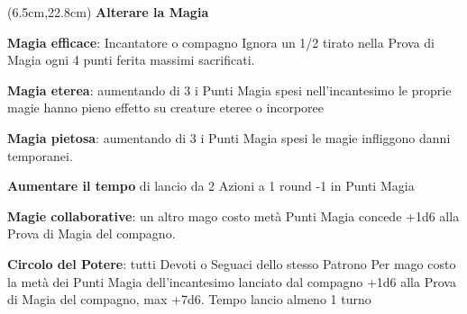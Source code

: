 \documentclass[a4paper,12 pt,openany]{book}
\begin{document}
{\small
\begin{textblock*}{13.5cm}(6.5cm,22.8cm) %
\textbf{Alterare la Magia}

	\textbf{Magia efficace}: Incantatore o compagno Ignora un 1/2 tirato nella Prova di Magia ogni 4 punti ferita massimi sacrificati.

	\textbf{Magia eterea}: aumentando di 3 i Punti Magia spesi nell'incantesimo le proprie magie hanno pieno effetto su creature eteree o incorporee

	\textbf{Magia pietosa}: aumentando di 3 i Punti Magia spesi le magie infliggono danni temporanei.

	\textbf{Aumentare il tempo} di lancio da 2 Azioni a 1 round -1 in Punti Magia

	\textbf{Magie collaborative}: un altro mago costo metà Punti Magia concede +1d6 alla Prova di Magia del compagno.

	\textbf{Circolo del Potere}: tutti Devoti o Seguaci dello stesso Patrono
	Per mago costo la metà dei Punti Magia dell'incantesimo lanciato dal compagno +1d6 alla Prova di Magia del compagno, max +7d6. Tempo lancio almeno 1 turno
\end{textblock*}}

	 	~\newpage
\end{document}
